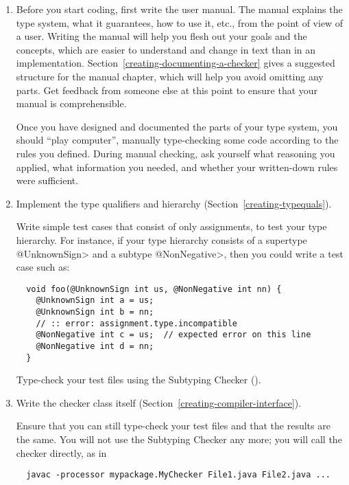 \begin{enumerate}
\item
  Before you start coding, first write the user manual.  The manual
  explains the type system, what it guarantees, how to use it, etc., from
  the point of view of a user.  Writing the manual will help you flesh out
  your goals and the concepts, which are easier to understand and change in
  text than in an implementation.
  Section~\ref{creating-documenting-a-checker} gives a suggested structure
  for the manual chapter, which will help you avoid omitting any parts.
  Get feedback from someone else at this point to ensure that your manual
  is comprehensible.

  Once you have designed and documented the parts of your type system, you
  should ``play computer'', manually
  type-checking some code according to the rules you defined.
  During manual checking, ask
  yourself what reasoning you applied, what information you needed, and
  whether your written-down rules were sufficient.

\item
  Implement the type qualifiers and hierarchy
  (Section~\ref{creating-typequals}).

  Write simple test cases that consist of only assignments,
  to test your type hierarchy.  For instance, if
  your type hierarchy consists of a supertype \<@UnknownSign> and a subtype
  \<@NonNegative>, then you could write a test case such as:

\begin{Verbatim}
  void foo(@UnknownSign int us, @NonNegative int nn) {
    @UnknownSign int a = us;
    @UnknownSign int b = nn;
    // :: error: assignment.type.incompatible
    @NonNegative int c = us;  // expected error on this line
    @NonNegative int d = nn;
  }
\end{Verbatim}

  Type-check your test files using the Subtyping Checker
  ().

\item
  Write the checker class itself
  (Section~\ref{creating-compiler-interface}).

  Ensure that you can still type-check your test files and that the results
  are the same.  You will not use the Subtyping Checker any more; you will
  call the checker directly, as in

\begin{Verbatim}
  javac -processor mypackage.MyChecker File1.java File2.java ...
\end{Verbatim}


\end{enumerate}
